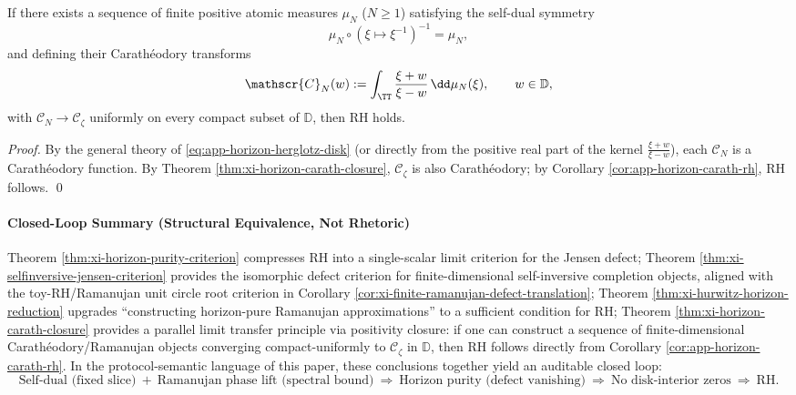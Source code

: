 \begin{corollary}[Finite-Dimensional Ramanujan Certificate Sequence \texorpdfstring{$\Rightarrow$}{=>} RH: An Auditable Route]\label{cor:xi-finite-ramanujan-carath-implies-rh}
If there exists a sequence of finite positive atomic measures \(\mu_N\) (\(N\ge 1\)) satisfying the self-dual symmetry
\[
\mu_N\circ(\xi\mapsto\xi^{-1})^{-1}=\mu_N,
\]
and defining their Carath\'eodory transforms
\[
\mathscr{C}_N(w):=\int_{\TT}\frac{\xi+w}{\xi-w}\,\dd\mu_N(\xi),\qquad w\in\mathbb{D},
\]
with \(\mathscr{C}_N\to \mathscr{C}_{\zeta}\) uniformly on every compact subset of \(\mathbb{D}\), then RH holds.
\end{corollary}

\begin{proof}
By the general theory of \eqref{eq:app-horizon-herglotz-disk} (or directly from the positive real part of the kernel \(\frac{\xi+w}{\xi-w}\)), each \(\mathscr{C}_N\) is a Carath\'eodory function.
By Theorem \ref{thm:xi-horizon-carath-closure}, \(\mathscr{C}_{\zeta}\) is also Carath\'eodory; by Corollary \ref{cor:app-horizon-carath-rh}, RH follows. \qed
\end{proof}

\paragraph{Closed-Loop Summary (Structural Equivalence, Not Rhetoric)}
Theorem \ref{thm:xi-horizon-purity-criterion} compresses RH into a single-scalar limit criterion for the Jensen defect;
Theorem \ref{thm:xi-selfinversive-jensen-criterion} provides the isomorphic defect criterion for finite-dimensional self-inversive completion objects, aligned with the toy-RH/Ramanujan unit circle root criterion in Corollary \ref{cor:xi-finite-ramanujan-defect-translation};
Theorem \ref{thm:xi-hurwitz-horizon-reduction} upgrades ``constructing horizon-pure Ramanujan approximations'' to a sufficient condition for RH;
Theorem \ref{thm:xi-horizon-carath-closure} provides a parallel limit transfer principle via positivity closure: if one can construct a sequence of finite-dimensional Carath\'eodory/Ramanujan objects converging compact-uniformly to \(\mathscr{C}_{\zeta}\) in \(\mathbb{D}\), then RH follows directly from Corollary \ref{cor:app-horizon-carath-rh}.
In the protocol-semantic language of this paper, these conclusions together yield an auditable closed loop:
\[
\text{Self-dual (fixed slice)}\ +\ \text{Ramanujan phase lift (spectral bound)}
\ \Longrightarrow\
\text{Horizon purity (defect vanishing)}
\ \Longrightarrow\
\text{No disk-interior zeros}
\ \Longrightarrow\
\text{RH}.
\]
\endinput
